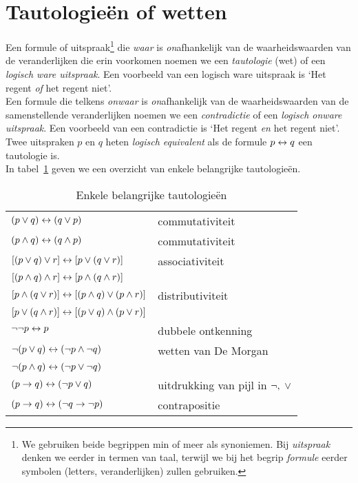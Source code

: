 \section{Tautologie\"{e}n of wetten}
\label{sec:logTautologie}
Een formule of uitspraak\footnote{We gebruiken beide begrippen min of meer als synoniemen. Bij \emph{uitspraak} denken we eerder in termen van taal, terwijl we bij het begrip \emph{formule} eerder symbolen (letters, veranderlijken) zullen gebruiken.} die \emph{waar} is \emph{on}afhankelijk van de waarheidswaarden van de veranderlijken die erin voorkomen noemen we een \emph{tautologie} (wet) of een \emph{logisch ware uitspraak}. Een voorbeeld van een logisch ware uitspraak is `Het regent \emph{of} het regent niet'.\\


\noindent
Een formule die telkens \emph{onwaar} is \emph{on}afhankelijk van de waarheidswaarden van de samenstellende veranderlijken noemen we een \emph{contradictie} of een \emph{logisch onware uitspraak}. Een voorbeeld van een contradictie is `Het regent \emph{en} het regent niet'.\\

\noindent
Twee uitspraken $p$ en $q$ heten \emph{logisch equivalent} als de formule $p \leftrightarrow q$ een tautologie is.\\


\noindent
In tabel~\ref{tautologie} geven we een overzicht van enkele belangrijke tautologieën.


\begin{table}[htb]
\centering
\begin{tabular}{|ll|}
\hline
$(p \vee q)\leftrightarrow (q\vee p)$ & commutativiteit  \\
$(p \wedge q)\leftrightarrow (q\wedge p)$ & commutativiteit\\
$\left[\left(p\vee q\right)\vee r\right]\leftrightarrow\left[p\vee\left(q\vee r\right)\right]$ &associativiteit \\
$\left[\left(p\wedge q\right)\wedge r\right]\leftrightarrow\left[p\wedge\left(q\wedge r\right)\right]$& \\
$\left[  p\wedge(q\vee r) \right]\leftrightarrow\left[ (p\wedge q)\vee(p\wedge r) \right] $& distributiviteit \\
$\left[  p\vee(q\wedge r) \right]\leftrightarrow\left[ (p\vee q)\wedge(p\vee r) \right] $& \\
$\neg \neg p \leftrightarrow p$ & dubbele ontkenning \\
$ \neg (p \vee q) \leftrightarrow (\neg p \wedge \neg q) $ & wetten van De Morgan \\
$ \neg (p \wedge q) \leftrightarrow (\neg p \vee \neg q) $ & \\
$ (p\rightarrow q) \leftrightarrow (\neg p \vee q) $ & uitdrukking van pijl in $\neg,~\vee$ \\
$(p \rightarrow q) \leftrightarrow (\neg q \rightarrow \neg p)$ & contrapositie \\

\hline
\end{tabular}
\caption{Enkele belangrijke tautologieën}
\label{tautologie}
\end{table}

